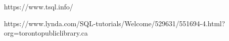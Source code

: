 https://www.tsql.info/

https://www.lynda.com/SQL-tutorials/Welcome/529631/551694-4.html?org=torontopubliclibrary.ca